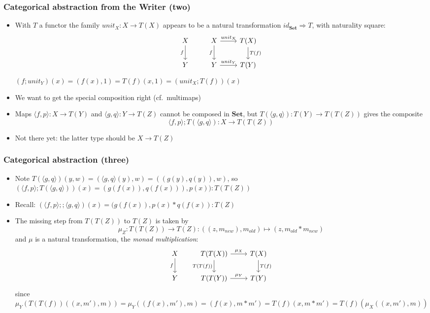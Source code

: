 \documentclass[handout]{beamer}
\newcommand{\To}{\Rightarrow}
\newcommand{\bfsf}[1]{{\boldsymbol{#1}}}
\newcommand{\Set}{\bfsf{Set}}
\newcommand{\Kp}[1]{{\langle #1 \rangle}}
\newcommand{\Kc}{;\!;}
\begin{document}
\frame
  {   
    \frametitle{Categorical abstraction from the Writer (two)}\label{Mon5:CatAbstrTwo}

 \begin{itemize}[<+->]
\item With $T$ a functor the family $unit_X: X\to T(X)$ appears to be
a natural transformation $id_\Set \To T$, with naturality square:
\[
\begin{tikzcd}[ampersand replacement=\&]
X \arrow[swap]{d}{f} \& X  \arrow[swap]{d}{f}\arrow{r}{unit_X} \&\arrow{d}{T(f)} T(X)\\
Y \& Y  \arrow{r}{unit_Y} \& T(Y)
\end{tikzcd}
\]
$(f;unit_Y)(x)=(f(x),1) = T(f)(x,1) = (unit_X;T(f))(x)$
\item We want to get the special composition right (cf.\ multimaps)
\item Maps $\Kp{f,p}: X\to T(Y)$ and $\Kp{g,q}: Y\to T(Z)$ cannot be composed
in $\Set$, but $T(\Kp{g,q}) : T(Y) \to T(T(Z))$ gives the composite
$$\Kp{f,p};T(\Kp{g,q}) : X \to T(T(Z))$$
\item Not there yet: the latter type should be $X \to T(Z)$
 \end{itemize}

 }


\frame
  {
    \frametitle{Categorical abstraction (three)}\label{Mon5:CatAbstrThree}

 \begin{itemize}[<+->]
\item Note $T(\Kp{g,q})(y,w) =  (\Kp{g,q}(y),w) = ((g(y),q(y)),w)$, so
$(\Kp{f,p};T(\Kp{g,q}))(x) = (g(f(x)),q(f(x))),p(x)): T(T(Z))$
\item Recall: $(\Kp{f,p}\Kc \Kp{g,q})(x) = (g(f(x)),p(x)*q(f(x)) : T(Z)$
\item The missing step from $T(T(Z))$ to $T(Z)$ is taken by
$$\mu_Z: T(T(Z))\to T(Z): ((z,m_{new}),m_{old}) \mapsto (z,m_{old}*m_{new})$$
and $\mu$ is a natural transformation, the \emph{monad multiplication}:
\[
\begin{tikzcd}[ampersand replacement=\&]
X \arrow[swap]{d}{f} \& T(T(X))  \arrow[swap]{d}{T(T(f))}\arrow{r}{\mu_X} \&\arrow{d}{T(f)} T(X)\\
Y \& T(T(Y))  \arrow{r}{\mu_Y} \& T(Y)
\end{tikzcd}
\]
since $\mu_Y(T(T(f))((x,m'),m)) = \mu_Y((f(x),m'),m) = (f(x), m*m')
= T(f)(x,m*m') = T(f)(\mu_X((x,m'),m))$
 \end{itemize}

 }
\end{document}
